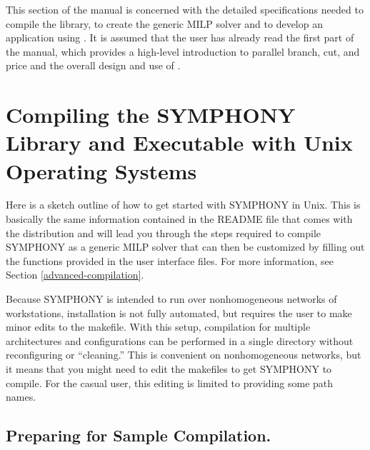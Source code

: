 This section of the manual is concerned with the detailed
specifications needed to compile the \BB library, to create the generic 
MILP solver and to develop an application using \BB. It is
assumed that the user has already read the first part of the manual, which
provides a high-level introduction to parallel branch, cut, and price
and the overall design and use of \BB. 


\section{Compiling the SYMPHONY Library and Executable with Unix 
Operating Systems}

\label{getting_started_unix}

Here is a sketch outline of how to get started with SYMPHONY in Unix. This is
basically the same information contained in the README file that comes with
the distribution and will lead you through the steps required to compile
SYMPHONY as a generic MILP solver that can then be customized by filling out
the functions provided in the user interface files. For more information, see
Section \ref{advanced-compilation}. 

Because SYMPHONY is intended to run over
nonhomogeneous networks of workstations, installation is not fully automated,
but requires the user to make minor edits to the makefile.  With this setup,
compilation for multiple architectures and configurations can be performed in
a single directory without reconfiguring or ``cleaning.'' This is convenient
on nonhomogeneous networks, but it means that you might need to edit the
makefiles to get SYMPHONY to compile. For the casual user, this editing is
limited to providing some path names.

\subsection{Preparing for Sample Compilation.}

